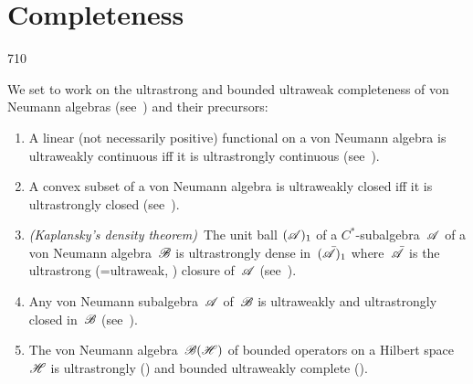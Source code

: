 \section{Completeness}
\begin{parsec}{710}%
\begin{point}{10}%
We set to work on the ultrastrong and bounded ultraweak completeness
of von Neumann algebras (see~) and their precursors:
\begin{enumerate}
\item
A linear (not necessarily positive)
functional on a von Neumann algebra
is ultraweakly continuous iff it is ultrastrongly continuous
(see~).
\item
A convex subset of a von Neumann algebra
is ultraweakly closed iff it is ultrastrongly closed
(see~).
\item
\emph{(Kaplansky's density theorem)}\ 
The unit ball $(\mathscr{A})_1$
of a $C^*$-subalgebra~$\mathscr{A}$
of a von Neumann algebra~$\mathscr{B}$
is ultrastrongly dense in~$(\bar{\mathscr{A}})_1$
where~$\bar{\mathscr{A}}$ is the ultrastrong (=ultraweak,
) closure of~$\mathscr{A}$
(see~).
\item
Any von Neumann subalgebra~$\mathscr{A}$
of~$\mathscr{B}$ is ultraweakly and ultrastrongly
closed in~$\mathscr{B}$
(see~).
\item
The von Neumann algebra~$\mathscr{B}(\mathscr{H})$ 
of bounded operators on a Hilbert space~$\mathscr{H}$
is ultrastrongly 
()
and bounded ultraweakly complete
().
\end{enumerate}

\end{point}
\end{parsec}
